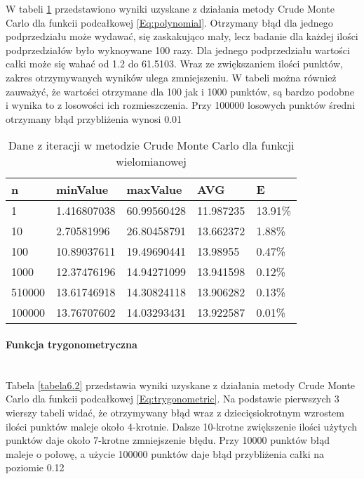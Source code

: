 \documentclass[12pt,twoside]{article}
\begin{document}
W tabeli \ref{tabela6.1} przedstawiono wyniki uzyskane z działania metody Crude Monte Carlo dla funkcii podcałkowej \eqref{Eq:polynomial}.
Otrzymany błąd dla jednego podprzedziału może wydawać, się zaskakująco mały, lecz badanie dla każdej ilości podprzedziałów było wyknoywane 100 razy. Dla jednego podprzedziału wartości całki może się wahać od 1.2 do 61.5103. Wraz ze zwiększaniem ilości punktów, zakres otrzymywanych wyników ulega zmniejszeniu. W tabeli można również zauważyć, że wartości otrzymane dla 100 jak i 1000 punktów, są bardzo podobne i wynika to z losowości ich rozmieszczenia.
Przy 100000 losowych punktów średni otrzymany błąd przybliżenia wynosi 0.01%


\begin{table}[H]
\centering 
\caption{Dane z iteracji w metodzie Crude Monte Carlo dla funkcji wielomianowej}
\label{tabela6.1}
\begin{tabular}{lllll}
\toprule
n &  minValue &  maxValue &       AVG &      E \\
\midrule
1 & 1.416807038 &   60.99560428 & 11.987235 & 13.91\% \\
10 & 2.70581996 &   26.80458791 & 13.662372 & 1.88\% \\
100 & 10.89037611 &  19.49690441 & 13.98955& 0.47\% \\
1000 & 12.37476196 &   14.94271099 & 13.941598 & 0.12\% \\
510000 & 13.61746918 &  14.30824118 & 13.906282 & 0.13\% \\
100000 & 13.76707602 &  14.03293431 & 13.922587 & 0.01\% \\
\bottomrule
\end{tabular}
\end{table}


\paragraph{Funkcja trygonometryczna}\mbox{} \\

Tabela \ref{tabela6.2} przedstawia wyniki uzyskane z działania metody Crude Monte Carlo dla funkcii podcałkowej \eqref{Eq:trygonometric}.
Na podstawie pierwszych 3 wierszy tabeli widać, że otrzymywany błąd wraz z dziecięsiokrotnym wzrostem ilości punktów maleje około 4-krotnie.
Dalsze 10-krotne zwiększenie ilości użytych punktów daje około 7-krotne zmniejszenie błędu. Przy 10000 punktów błąd maleje o połowę, a użycie 100000 punktów daje błąd przybliżenia całki na poziomie 0.12%
\end{document}
